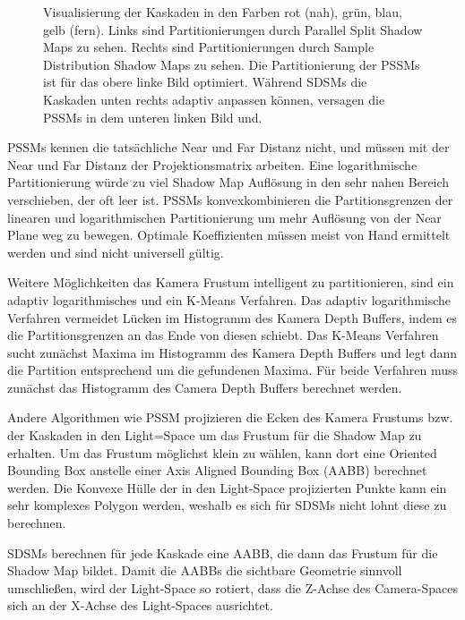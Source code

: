 \documentclass[runningheaders,a4paper]{llncs}
\begin{document}
\begin{figure}[H]
	\caption{
		Visualisierung der Kaskaden in den Farben rot (nah), grün, blau, gelb (fern).
		Links sind Partitionierungen durch Parallel Split Shadow Maps zu sehen.
		Rechts sind Partitionierungen durch Sample Distribution Shadow Maps zu sehen.
		Die Partitionierung der PSSMs ist für das obere linke Bild optimiert.
		Während SDSMs die Kaskaden unten rechts adaptiv anpassen können, versagen die PSSMs in dem unteren linken Bild und.
	}
\end{figure}


PSSMs kennen die tatsächliche Near und Far Distanz nicht, und müssen mit der Near und Far Distanz der Projektionsmatrix arbeiten.
Eine logarithmische Partitionierung würde zu viel Shadow Map Auflösung in den sehr nahen Bereich verschieben, der oft leer ist.
PSSMs konvexkombinieren die Partitionsgrenzen der linearen und logarithmischen Partitionierung um mehr Auflösung von der Near Plane weg zu bewegen.
Optimale Koeffizienten müssen meist von Hand ermittelt werden und sind nicht universell gültig.

Weitere Möglichkeiten das Kamera Frustum intelligent zu partitionieren, sind ein adaptiv logarithmisches und ein K-Means Verfahren.
Das adaptiv logarithmische Verfahren vermeidet Lücken im Histogramm des Kamera Depth Buffers, indem es die Partitionsgrenzen an das Ende von diesen schiebt.
Das K-Means Verfahren sucht zunächst Maxima im Histogramm des Kamera Depth Buffers und legt dann die Partition entsprechend um die gefundenen Maxima.
Für beide Verfahren muss zunächst das Histogramm des Camera Depth Buffers berechnet werden.


Andere Algorithmen wie PSSM \cite{pssm} projizieren die Ecken des Kamera Frustums bzw. der Kaskaden in den Light=Space um das Frustum für die Shadow Map zu erhalten.
Um das Frustum möglichst klein zu wählen, kann dort eine Oriented Bounding Box anstelle einer Axis Aligned Bounding Box (AABB) berechnet werden.
Die Konvexe Hülle der in den Light-Space projizierten Punkte kann ein sehr komplexes Polygon werden, weshalb es sich für SDSMs nicht lohnt diese zu berechnen.

SDSMs berechnen für jede Kaskade eine AABB, die dann das Frustum für die Shadow Map bildet.
Damit die AABBs die sichtbare Geometrie sinnvoll umschließen, wird der Light-Space so rotiert, dass die Z-Achse des Camera-Spaces sich an der X-Achse des Light-Spaces ausrichtet.
\end{document}
